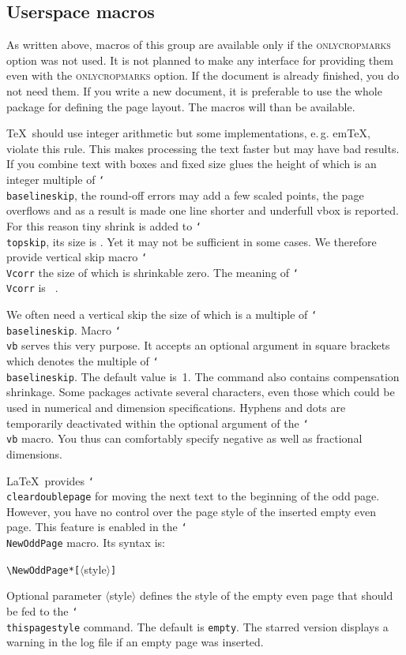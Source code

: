 \documentclass[11pt]{article}
\makeatletter
\def\mg#1{\ifvmode\leavevmode\fi\marginpar{\texttt{#1}}\ignorespaces}
\def\cmg#1{\mg{\char`\\#1}}
\def\opt#1{\texorpdfstring{\textmd{\textsc{#1}}}{#1}}
\DeclareRobustCommand\cmd[1]{\texttt{\char`\\#1}}
\def\eg.{e.\,g.\@}
\let\zwcomma\,
\def\,{\texorpdfstring{\zwcomma}{}}
\makeatother
\begin{document}
\subsection{Userspace macros}\label{user.macros}
As written above, macros of this group are available only if the \opt{onlycropmarks} option was not
used. It is not planned to make any interface for providing them even with the \opt{onlycropmarks}
option. If the document is already finished, you do not need them. If you write a new document, it
is preferable to use the whole package for defining the page layout. The macros will than be
available.

\cmg{topskip}
\cmg{Vcorr}
\TeX\ should use integer arithmetic but some implementations, \eg. em\TeX, violate this rule. This
makes processing the text faster but may have bad results. If you combine text with boxes and fixed
size glues the height of which is an integer multiple of \cmd{baselineskip}, the round-off errors
may add a few scaled points, the page overflows and as a result is made one line shorter and
underfull vbox is reported. For this reason tiny shrink is added to \cmd{topskip}, its
size is \the\topskip. Yet it may not be sufficient in some cases. We therefore provide vertical
skip macro \cmd{Vcorr} the size of which is shrinkable zero. The meaning of \cmd{Vcorr} is {\tt
\meaning\Vcorr}.

\cmg{vb}
We often need a vertical skip the size of which is a multiple of \cmd{baselineskip}. Macro \cmd{vb}
serves this very purpose. It accepts an optional argument in square brackets which denotes the
multiple of \cmd{baselineskip}. The default value is~1. The command also contains compensation
shrinkage. Some packages activate several characters, even those which could be used in numerical
and dimension specifications. Hyphens and dots are temporarily deactivated within the optional
argument of the \cmd{vb} macro. You thus can comfortably specify negative as well as fractional
dimensions.

\cmg{NewOddPage}
\LaTeX\ provides \cmd{cleardoublepage} for moving the next text to the beginning of the odd page.
However, you have no control over the page style of the inserted empty even page. This feature is
enabled in the \cmd{NewOddPage} macro. Its syntax is:

\medskip
\verb;\NewOddPage*[;$\langle$style$\rangle$\verb;];

\medskip\noindent
Optional parameter $\langle$style$\rangle$ defines the style of the empty even page that should be
fed to the \cmd{thispagestyle} command. The default is \texttt{empty}. The starred version displays
a warning in the log file if an empty page was inserted.
\end{document}
